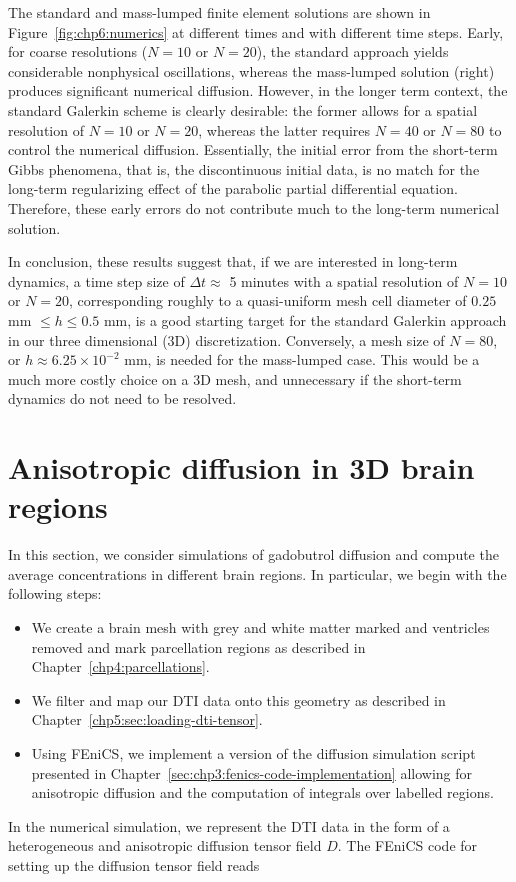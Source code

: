 The standard and mass-lumped finite element solutions are shown in
Figure~\ref{fig:chp6:numerics} at different times and with different
time steps. Early, for coarse resolutions ($N = 10$ or $N=20$), the
standard approach yields considerable nonphysical oscillations, whereas 
the mass-lumped solution (right) produces significant numerical
diffusion. However, in the longer term context, the standard Galerkin
scheme is clearly desirable: the former allows for a spatial
resolution of $N=10$ or $N=20$, whereas the latter requires $N=40$ or
$N=80$ to control the numerical diffusion. Essentially, the initial
error from the short-term Gibbs phenomena, that is, the discontinuous
initial data, is no match for the long-term regularizing effect of the
parabolic partial differential equation. Therefore, these early errors do not contribute much to the
long-term numerical solution.

In conclusion, these results suggest that, if we are interested in
long-term dynamics, a time step size of $\Delta t \approx$ 5 minutes with
a spatial resolution of $N=10$ or $N=20$, corresponding roughly to a
quasi-uniform mesh cell diameter of $0.25$ mm $\leq h \leq 0.5$ mm, is
a good starting target for the standard Galerkin approach in our three dimensional 
(3D) discretization. Conversely, a mesh size of $N = 80$, or $ h \approx
6.25\times 10^{-2}$ mm, is needed for the mass-lumped case.  This would
be a much more costly choice on a 3D mesh, and unnecessary if the
short-term dynamics do not need to be resolved.

\section{Anisotropic diffusion in 3D brain regions}

In this section, we consider simulations of gadobutrol diffusion 
and compute the average concentrations in different brain regions. In
particular, we begin with the following steps:
\begin{itemize}
\item
  We create a brain mesh with grey and white matter marked and
  ventricles removed and mark parcellation regions as described in
  Chapter~\ref{chp4:parcellations}. 
\item
  We filter and map our DTI data onto this geometry as described in 
  Chapter~\ref{chp5:sec:loading-dti-tensor}.
\item
  Using FEniCS, we implement a version of the diffusion simulation
  script presented in
  Chapter~\ref{sec:chp3:fenics-code-implementation} allowing for
  anisotropic diffusion and the computation of integrals over labelled
  regions.
\end{itemize}
In the numerical simulation, we represent the DTI data in the form of
a heterogeneous and anisotropic diffusion tensor field $D$. The FEniCS
code for setting up the diffusion tensor field reads 

